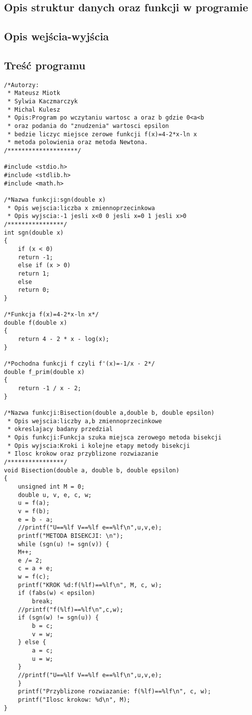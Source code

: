 \documentclass[11pt]{article} %
\begin{document}
\subsection{Opis struktur danych oraz funkcji w programie}

\subsection{Opis wejścia-wyjścia}
\subsection{Treść programu}
\begin{lstlisting}
/*Autorzy:
 * Mateusz Miotk
 * Sylwia Kaczmarczyk
 * Michal Kulesz
 * Opis:Program po wczytaniu wartosc a oraz b gdzie 0<a<b
 * oraz podania do "znudzenia" wartosci epsilon
 * bedzie liczyc miejsce zerowe funkcji f(x)=4-2*x-ln x
 * metoda polowienia oraz metoda Newtona.
/********************/

#include <stdio.h>
#include <stdlib.h>
#include <math.h>

/*Nazwa funkcji:sgn(double x)
 * Opis wejscia:liczba x zmiennoprzecinkowa
 * Opis wyjscia:-1 jesli x<0 0 jesli x=0 1 jesli x>0
/****************/
int sgn(double x)
{
    if (x < 0)
	return -1;
    else if (x > 0)
	return 1;
    else
	return 0;
}

/*Funkcja f(x)=4-2*x-ln x*/
double f(double x)
{
    return 4 - 2 * x - log(x);
}

/*Pochodna funkcji f czyli f'(x)=-1/x - 2*/
double f_prim(double x)
{
    return -1 / x - 2;
}

/*Nazwa funkcji:Bisection(double a,double b, double epsilon)
 * Opis wejscia:liczby a,b zmiennoprzecinkowe 
 * okreslajacy badany przedzial
 * Opis funkcji:Funkcja szuka miejsca zerowego metoda bisekcji
 * Opis wyjscia:Kroki i kolejne etapy metody bisekcji
 * Ilosc krokow oraz przyblizone rozwiazanie
/****************/
void Bisection(double a, double b, double epsilon)
{
    unsigned int M = 0;
    double u, v, e, c, w;
    u = f(a);
    v = f(b);
    e = b - a;
    //printf("U==%lf V==%lf e==%lf\n",u,v,e);
    printf("METODA BISEKCJI: \n");
    while (sgn(u) != sgn(v)) {
	M++;
	e /= 2;
	c = a + e;
	w = f(c);
	printf("KROK %d:f(%lf)==%lf\n", M, c, w);
	if (fabs(w) < epsilon)
	    break;
	//printf("f(%lf)==%lf\n",c,w);
	if (sgn(w) != sgn(u)) {
	    b = c;
	    v = w;
	} else {
	    a = c;
	    u = w;
	}
	//printf("U==%lf V==%lf e==%lf\n",u,v,e);
    }
    printf("Przyblizone rozwiazanie: f(%lf)==%lf\n", c, w);
    printf("Ilosc krokow: %d\n", M);
}


\end{lstlisting}
\end{document}
